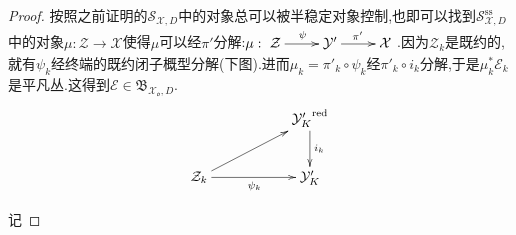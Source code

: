 \begin{enumerate}
\begin{proof}
    	\qquad
    	
    	按照之前证明的$\mathcal{S}_{\mathcal{X},D}$中的对象总可以被半稳定对象控制,也即可以找到$\mathcal{S}^{\mathrm{ss}}_{\mathcal{X},D}$中的对象$\mu:\mathcal{Z}\to\mathcal{X}$使得$\mu$可以经$\pi'$分解:$\mu:\xymatrix{\mathcal{Z}\ar[r]^{\psi}&\mathcal{Y}'\ar[r]^{\pi'}&\mathcal{X}}$.因为$\mathcal{Z}_k$是既约的,就有$\psi_k$经终端的既约闭子概型分解(下图).进而$\mu_k=\pi'_k\circ\psi_k$经$\pi'_k\circ i_k$分解,于是$\mu_k^*\mathcal{E}_k$是平凡丛.这得到$\mathcal{E}\in\mathfrak{B}_{\mathcal{X}_{\mathfrak{o}},D}$.
    	$$\xymatrix{&&{\mathcal{Y}_K'}^{\mathrm{red}}\ar[d]^{i_k}\\\mathcal{Z}_k\ar[urr]\ar[rr]_{\psi_k}&&\mathcal{Y}_K'}$$
    	
    	记
    	
    	
    	
    \end{proof}
\end{enumerate}

 